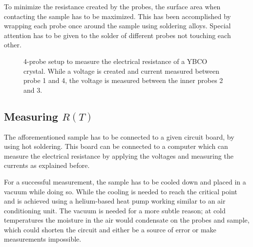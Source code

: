 To minimize the resistance created by the probes, the surface area when contacting the sample has to be
maximized. This has been accomplished by wrapping each probe once around the sample using
soldering alloys. Special attention has to be given to the solder of different probes not touching each
other.

\begin{figure}
  \centering
    \caption{4-probe setup to measure the electrical resistance of a YBCO crystal. While a voltage
      is created and current measured between probe 1 and 4, the voltage is measured between the
    inner probes 2 and 3.}
  \label{fig:4-probe-setup}
\end{figure}

\subsection{Measuring $R(T)$}
\label{sec:Measuring $R(T)$}
The afforementioned sample has to be connected to a given circuit board, by using hot soldering.
This board can be connected to a computer which can measure the electrical resistance by applying
the voltages and measuring the currents as explained before. 

For a successful measurement, the sample has to be cooled down and placed in a vacuum while doing
so. While the cooling is needed to reach the critical point and is achieved using a helium-based
heat pump working similar to an air conditioning unit. The vacuum is needed for a more subtle
reason; at cold temperatures the moisture in the air would condensate on the probes and sample,
which could shorten the circuit and either be a source of error or make measurements impossible.

